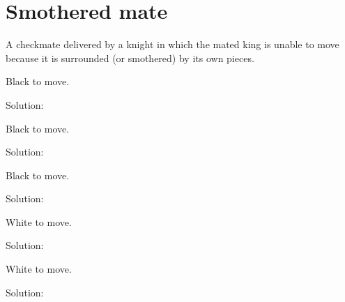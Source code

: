\documentclass{book}
\begin{document}
\section{Smothered mate}
A checkmate delivered by a knight in which the mated king is unable to move because it is surrounded (or smothered) by its own pieces.\begin{multicols}{2} 
\begin{samepage} 
\newgame 


 
\showboard
 
 Black to move. 
 
Solution: 
 
\end{samepage}\begin{samepage} 
\newgame 


 
\showboard
 
 Black to move. 
 
Solution: 
 
\end{samepage}\begin{samepage} 
\newgame 


 
\showboard
 
 Black to move. 
 
Solution: 
 
\end{samepage}\begin{samepage} 
\newgame 


 
\showboard
 
 White to move. 
 
Solution: 
 
\end{samepage}\begin{samepage} 
\newgame 


 
\showboard
 
 White to move. 
 
Solution: 
 
\end{samepage}\end{multicols} 
\newpage 
\end{document}
